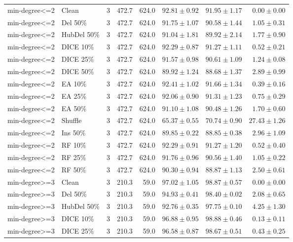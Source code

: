 {\begin{longtable}{llrrrrrr}
min-degree<=2 & Clean & 3 & 472.7 & 624.0 & $92.81\pm0.92$ & $91.95\pm1.17$ & $0.00\pm0.00$ \\
min-degree<=2 & Del 50\% & 3 & 472.7 & 624.0 & $91.75\pm1.07$ & $90.58\pm1.44$ & $1.05\pm0.31$ \\
min-degree<=2 & HubDel 50\% & 3 & 472.7 & 624.0 & $91.04\pm1.81$ & $89.92\pm2.14$ & $1.77\pm0.90$ \\
min-degree<=2 & DICE 10\% & 3 & 472.7 & 624.0 & $92.29\pm0.87$ & $91.27\pm1.11$ & $0.52\pm0.21$ \\
min-degree<=2 & DICE 25\% & 3 & 472.7 & 624.0 & $91.57\pm0.98$ & $90.61\pm1.09$ & $1.24\pm0.08$ \\
min-degree<=2 & DICE 50\% & 3 & 472.7 & 624.0 & $89.92\pm1.24$ & $88.68\pm1.37$ & $2.89\pm0.99$ \\
min-degree<=2 & EA 10\% & 3 & 472.7 & 624.0 & $92.41\pm1.02$ & $91.66\pm1.34$ & $0.39\pm0.16$ \\
min-degree<=2 & EA 25\% & 3 & 472.7 & 624.0 & $92.06\pm0.90$ & $91.31\pm1.23$ & $0.75\pm0.29$ \\
min-degree<=2 & EA 50\% & 3 & 472.7 & 624.0 & $91.10\pm1.08$ & $90.48\pm1.26$ & $1.70\pm0.60$ \\
min-degree<=2 & Shuffle & 3 & 472.7 & 624.0 & $65.37\pm0.55$ & $70.74\pm0.90$ & $27.43\pm1.26$ \\
min-degree<=2 & Ins 50\% & 3 & 472.7 & 624.0 & $89.85\pm0.22$ & $88.85\pm0.38$ & $2.96\pm1.09$ \\
min-degree<=2 & RF 10\% & 3 & 472.7 & 624.0 & $92.29\pm0.91$ & $91.27\pm1.20$ & $0.52\pm0.40$ \\
min-degree<=2 & RF 25\% & 3 & 472.7 & 624.0 & $91.76\pm0.96$ & $90.56\pm1.40$ & $1.05\pm0.22$ \\
min-degree<=2 & RF 50\% & 3 & 472.7 & 624.0 & $90.30\pm0.94$ & $88.87\pm1.13$ & $2.50\pm0.61$ \\
min-degree>=3 & Clean & 3 & 210.3 & 59.0 & $97.02\pm1.05$ & $98.87\pm0.57$ & $0.00\pm0.00$ \\
min-degree>=3 & Del 50\% & 3 & 210.3 & 59.0 & $94.93\pm0.41$ & $98.40\pm0.02$ & $2.08\pm0.65$ \\
min-degree>=3 & HubDel 50\% & 3 & 210.3 & 59.0 & $92.76\pm0.35$ & $97.75\pm0.10$ & $4.25\pm1.30$ \\
min-degree>=3 & DICE 10\% & 3 & 210.3 & 59.0 & $96.88\pm0.95$ & $98.88\pm0.46$ & $0.13\pm0.11$ \\
min-degree>=3 & DICE 25\% & 3 & 210.3 & 59.0 & $96.58\pm0.87$ & $98.67\pm0.51$ & $0.43\pm0.25$ \\

\end{longtable}}
